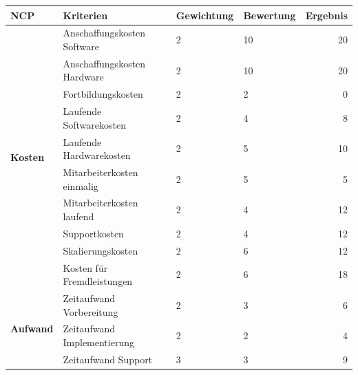 \begin{table}
	\centering
	\begin{tabular}{l|l|l|l|r|}
		\textbf{NCP}                           & \textbf{Kriterien}                  & \textbf{Gewichtung} & \textbf{Bewertung} & \textbf{Ergebnis} \\
		\hline \hline
		\multirow{10}{6em}{\textbf{Kosten}}    & Anschaffungskosten Software         & 2                   & 10                 & 20                \\
		~                                      & Anschaffungskosten Hardware         & 2                   & 10                 & 20                \\
		~                                      & Fortbildungskosten                  & 2                   & 2                  & 0                 \\
		~                                      & Laufende Softwarekosten             & 2                   & 4                  & 8                 \\
		~                                      & Laufende Hardwarekosten             & 2                   & 5                  & 10                \\
		~                                      & Mitarbeiterkosten einmalig          & 2                   & 5                  & 5                 \\
		~                                      & Mitarbeiterkosten laufend           & 2                   & 4                  & 12                \\
		~                                      & Supportkosten                       & 2                   & 4                  & 12                \\
		~                                      & Skalierungskosten                   & 2                   & 6                  & 12                \\
		~                                      & Kosten für Fremdleistungen          & 2                   & 6                  & 18                \\
		\cline{2-5}
		\multirow{6}{6em}{\textbf{Aufwand}}    & Zeitaufwand Vorbereitung            & 2                   & 3                  & 6                 \\
		~                                      & Zeitaufwand Implementierung         & 2                   & 2                  & 4                 \\
		~                                      & Zeitaufwand Support                 & 3                   & 3                  & 9                 \\

\end{tabular}
\end{table}
